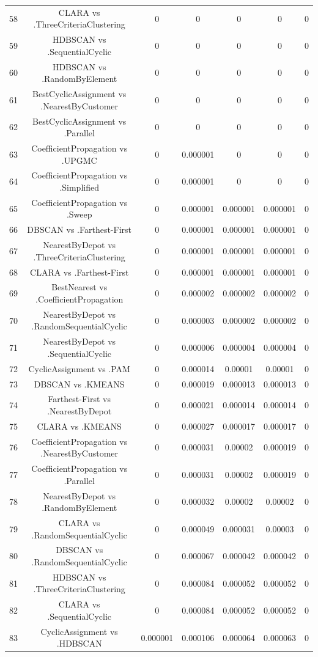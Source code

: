 \documentclass[a4paper,10pt]{article}
\begin{document}
\begin{landscape}
\begin{table}[!htp]
\begin{tabular}{ccccccc}
58&CLARA vs .ThreeCriteriaClustering&0&0&0&0&0\\
59&HDBSCAN vs .SequentialCyclic&0&0&0&0&0\\
60&HDBSCAN vs .RandomByElement&0&0&0&0&0\\
61&BestCyclicAssignment vs .NearestByCustomer&0&0&0&0&0\\
62&BestCyclicAssignment vs .Parallel&0&0&0&0&0\\
63&CoefficientPropagation vs .UPGMC&0&0.000001&0&0&0\\
64&CoefficientPropagation vs .Simplified&0&0.000001&0&0&0\\
65&CoefficientPropagation vs .Sweep&0&0.000001&0.000001&0.000001&0\\
66&DBSCAN vs .Farthest-First&0&0.000001&0.000001&0.000001&0\\
67&NearestByDepot vs .ThreeCriteriaClustering&0&0.000001&0.000001&0.000001&0\\
68&CLARA vs .Farthest-First&0&0.000001&0.000001&0.000001&0\\
69&BestNearest vs .CoefficientPropagation&0&0.000002&0.000002&0.000002&0\\
70&NearestByDepot vs .RandomSequentialCyclic&0&0.000003&0.000002&0.000002&0\\
71&NearestByDepot vs .SequentialCyclic&0&0.000006&0.000004&0.000004&0\\
72&CyclicAssignment vs .PAM&0&0.000014&0.00001&0.00001&0\\
73&DBSCAN vs .KMEANS&0&0.000019&0.000013&0.000013&0\\
74&Farthest-First vs .NearestByDepot&0&0.000021&0.000014&0.000014&0\\
75&CLARA vs .KMEANS&0&0.000027&0.000017&0.000017&0\\
76&CoefficientPropagation vs .NearestByCustomer&0&0.000031&0.00002&0.000019&0\\
77&CoefficientPropagation vs .Parallel&0&0.000031&0.00002&0.000019&0\\
78&NearestByDepot vs .RandomByElement&0&0.000032&0.00002&0.00002&0\\
79&CLARA vs .RandomSequentialCyclic&0&0.000049&0.000031&0.00003&0\\
80&DBSCAN vs .RandomSequentialCyclic&0&0.000067&0.000042&0.000042&0\\
81&HDBSCAN vs .ThreeCriteriaClustering&0&0.000084&0.000052&0.000052&0\\
82&CLARA vs .SequentialCyclic&0&0.000084&0.000052&0.000052&0\\
83&CyclicAssignment vs .HDBSCAN&0.000001&0.000106&0.000064&0.000063&0\\

\end{tabular}
\end{table}
\end{landscape}
\end{document}
